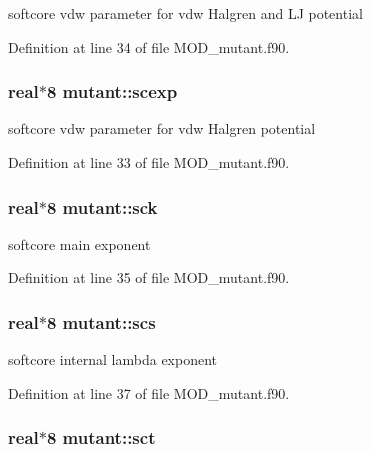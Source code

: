 softcore vdw parameter for vdw Halgren and L\-J potential 



Definition at line 34 of file M\-O\-D\-\_\-mutant.\-f90.

\hypertarget{classmutant_abfb067bfd2af142a9515f2cc61fc35b1}{
\subsubsection[{scexp}]{\setlength{\rightskip}{0pt plus 5cm}real$\ast$8 mutant\-::scexp}}\label{classmutant_abfb067bfd2af142a9515f2cc61fc35b1}


softcore vdw parameter for vdw Halgren potential 



Definition at line 33 of file M\-O\-D\-\_\-mutant.\-f90.

\hypertarget{classmutant_ac9c6937ee255a5b25c9faa8d1ba4467e}{
\subsubsection[{sck}]{\setlength{\rightskip}{0pt plus 5cm}real$\ast$8 mutant\-::sck}}\label{classmutant_ac9c6937ee255a5b25c9faa8d1ba4467e}


softcore main exponent 



Definition at line 35 of file M\-O\-D\-\_\-mutant.\-f90.

\hypertarget{classmutant_a1ba7a9ba70c79b70c1b56e81810237c6}{
\subsubsection[{scs}]{\setlength{\rightskip}{0pt plus 5cm}real$\ast$8 mutant\-::scs}}\label{classmutant_a1ba7a9ba70c79b70c1b56e81810237c6}


softcore internal lambda exponent 



Definition at line 37 of file M\-O\-D\-\_\-mutant.\-f90.

\hypertarget{classmutant_a2832686319ff2d15ef7f57c25b0e52f5}{
\subsubsection[{sct}]{\setlength{\rightskip}{0pt plus 5cm}real$\ast$8 mutant\-::sct}}\label{classmutant_a2832686319ff2d15ef7f57c25b0e52f5}


